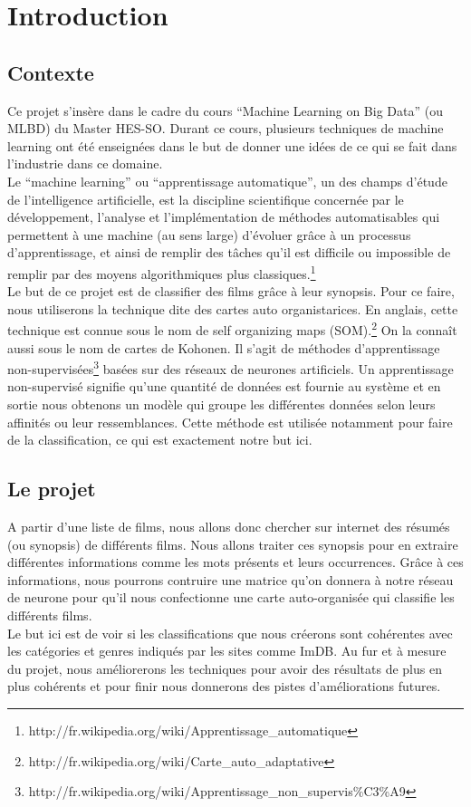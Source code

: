 \chapter{Introduction}

\section{Contexte}

Ce projet s'insère dans le cadre du cours ``Machine Learning on Big Data'' (ou MLBD) du Master HES-SO. Durant ce cours, plusieurs techniques de machine learning ont été enseignées dans le but de donner une idées de ce qui se fait dans l'industrie dans ce domaine. \\

Le ``machine learning'' ou ``apprentissage automatique'', un des champs d'étude de l'intelligence artificielle, est la discipline scientifique concernée par le développement, l'analyse et l'implémentation de méthodes automatisables qui permettent à une machine (au sens large) d'évoluer grâce à un processus d'apprentissage, et ainsi de remplir des tâches qu'il est difficile ou impossible de remplir par des moyens algorithmiques plus classiques.\footnote{http://fr.wikipedia.org/wiki/Apprentissage\_automatique} \\


Le but de ce projet est de classifier des films grâce à leur synopsis. Pour ce faire, nous utiliserons la technique dite des cartes auto organistarices. En anglais, cette technique est connue sous le nom de self organizing maps (SOM).\footnote{http://fr.wikipedia.org/wiki/Carte\_auto\_adaptative} On la connaît aussi sous le nom de cartes de Kohonen. Il s'agit de méthodes d'apprentissage non-supervisées\footnote{http://fr.wikipedia.org/wiki/Apprentissage\_non\_supervis\%C3\%A9} basées sur des réseaux de neurones artificiels. Un apprentissage non-supervisé signifie qu'une quantité de données est fournie au système et en sortie nous obtenons un modèle qui groupe les différentes données selon leurs affinités ou leur ressemblances. Cette méthode est utilisée notamment pour faire de la classification, ce qui est exactement notre but ici.

\section{Le projet}

A partir d'une liste de films, nous allons donc chercher sur internet des résumés (ou synopsis) de différents films. Nous allons traiter ces synopsis pour en extraire différentes informations comme les mots présents et leurs occurrences. Grâce à ces informations, nous pourrons contruire une matrice qu'on donnera à notre réseau de neurone pour qu'il nous confectionne une carte auto-organisée qui classifie les différents films.\\

Le but ici est de voir si les classifications que nous créerons sont cohérentes avec les catégories et genres indiqués par les sites comme ImDB. Au fur et à mesure du projet, nous améliorerons les techniques pour avoir des résultats de plus en plus cohérents et pour finir nous donnerons des pistes d'améliorations futures.

